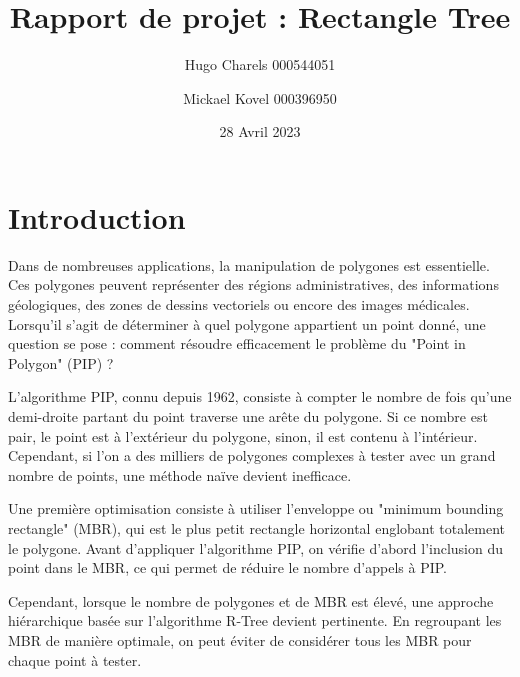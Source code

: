 \documentclass {article}
\begin{document}
\author {Hugo Charels 000544051 \and Mickael Kovel 000396950}
\date {28 Avril 2023}
\title {Rapport de projet : Rectangle Tree}
\maketitle
\newpage


\tableofcontents
\newpage
\section {Introduction}


Dans de nombreuses applications, la manipulation de polygones est essentielle. Ces polygones peuvent représenter 
des régions administratives, des informations géologiques, des zones de dessins vectoriels ou encore des 
images médicales. Lorsqu'il s'agit de déterminer à quel polygone appartient un point donné, une question se pose : 
comment résoudre efficacement le problème du "Point in Polygon" (PIP) ?

L'algorithme PIP, connu depuis 1962, consiste à compter le nombre de fois qu'une demi-droite partant du point 
traverse une arête du polygone. Si ce nombre est pair, le point est à l'extérieur du polygone, sinon, 
il est contenu à l'intérieur. Cependant, si l'on a des milliers de polygones complexes à tester avec un 
grand nombre de points, une méthode naïve devient inefficace.

Une première optimisation consiste à utiliser l'enveloppe ou "minimum bounding rectangle" (MBR), 
qui est le plus petit rectangle horizontal englobant totalement le polygone. Avant d'appliquer l'algorithme PIP, 
on vérifie d'abord l'inclusion du point dans le MBR, ce qui permet de réduire le nombre d'appels à PIP.

Cependant, lorsque le nombre de polygones et de MBR est élevé, une approche hiérarchique basée sur l'algorithme R-Tree 
devient pertinente. En regroupant les MBR de manière optimale, on peut éviter de considérer tous les MBR pour 
chaque point à tester.
\end{document}
